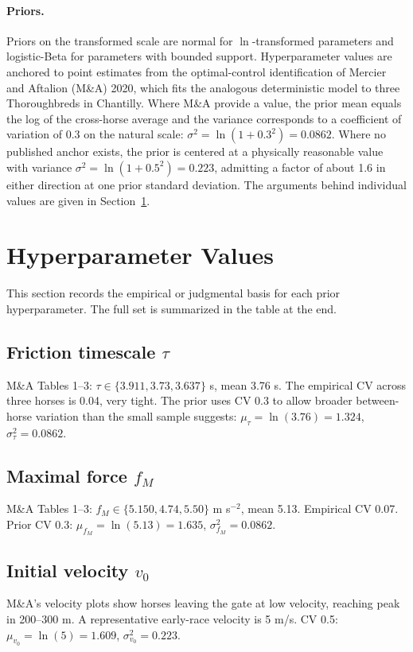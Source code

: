 \documentclass[11pt]{article}
\begin{document}
\paragraph{Priors.} Priors on the transformed scale are normal for $\ln$-transformed parameters and logistic-Beta for parameters with bounded support. Hyperparameter values are anchored to point estimates from the optimal-control identification of Mercier and Aftalion (M\&A) 2020, which fits the analogous deterministic model to three Thoroughbreds in Chantilly. Where M\&A provide a value, the prior mean equals the log of the cross-horse average and the variance corresponds to a coefficient of variation of 0.3 on the natural scale: $\sigma^2 = \ln(1 + 0.3^2) = 0.0862$. Where no published anchor exists, the prior is centered at a physically reasonable value with variance $\sigma^2 = \ln(1 + 0.5^2) = 0.223$, admitting a factor of about 1.6 in either direction at one prior standard deviation. The arguments behind individual values are given in Section~\ref{sec:hypervalues}.

\section{Hyperparameter Values}\label{sec:hypervalues}

This section records the empirical or judgmental basis for each prior hyperparameter. The full set is summarized in the table at the end.

\subsection*{Friction timescale $\tau$}
M\&A Tables 1–3: $\tau \in \{3.911, 3.73, 3.637\}$ s, mean 3.76 s. The empirical CV across three horses is 0.04, very tight. The prior uses CV 0.3 to allow broader between-horse variation than the small sample suggests: $\mu_\tau = \ln(3.76) = 1.324$, $\sigma_\tau^2 = 0.0862$.

\subsection*{Maximal force $f_M$}
M\&A Tables 1–3: $f_M \in \{5.150, 4.74, 5.50\}$ m s$^{-2}$, mean 5.13. Empirical CV 0.07. Prior CV 0.3: $\mu_{f_M} = \ln(5.13) = 1.635$, $\sigma_{f_M}^2 = 0.0862$.

\subsection*{Initial velocity $v_0$}
M\&A's velocity plots show horses leaving the gate at low velocity, reaching peak in 200–300 m. A representative early-race velocity is 5 m/s. CV 0.5: $\mu_{v_0} = \ln(5) = 1.609$, $\sigma_{v_0}^2 = 0.223$.
\end{document}

